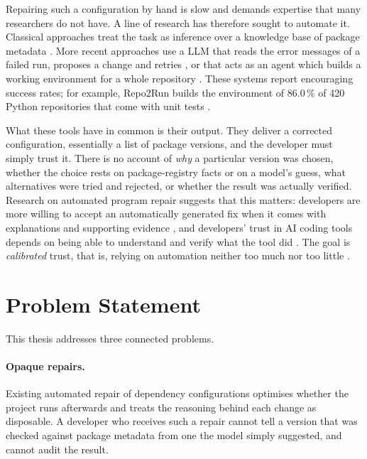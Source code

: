 Repairing such a configuration by hand is slow and demands expertise that many researchers do not have. A line of research has therefore sought to automate it. Classical approaches treat the task as inference over a knowledge base of package metadata \cite{horton2019dockerizeme,ye2022pyego,cheng2022pycre,cheng2024revisiting,wang2021sniffer}. More recent approaches use a \ac{LLM} that reads the error messages of a failed run, proposes a change and retries \cite{bartlett2025lastdependency}, or that acts as an agent which builds a working environment for a whole repository \cite{hu2025repo2run,eliseeva2025envbench}. These systems report encouraging success rates; for example, Repo2Run builds the environment of 86.0\,\% of 420 Python repositories that come with unit tests \cite{hu2025repo2run}.

What these tools have in common is their output. They deliver a corrected configuration, essentially a list of package versions, and the developer must simply trust it. There is no account of \emph{why} a particular version was chosen, whether the choice rests on package-registry facts or on a model's guess, what alternatives were tried and rejected, or whether the result was actually verified. Research on automated program repair suggests that this matters: developers are more willing to accept an automatically generated fix when it comes with explanations and supporting evidence \cite{noller2022trust,ryan2019trust,williams2024bloomberg}, and developers' trust in AI coding tools depends on being able to understand and verify what the tool did \cite{wang2024trust,ye2025copilotlens}. The goal is \emph{calibrated} trust, that is, relying on automation neither too much nor too little \cite{lee2004trust}.%

\section{Problem Statement}\label{sec:problem}

This thesis addresses three connected problems.

\paragraph{Opaque repairs.}
Existing automated repair of dependency configurations optimises whether the project runs afterwards and treats the reasoning behind each change as disposable. A developer who receives such a repair cannot tell a version that was checked against package metadata from one the model simply suggested, and cannot audit the result.

